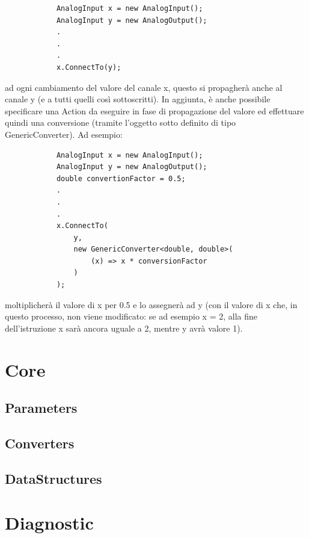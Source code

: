\documentclass{article}
\begin{document}
		\begin{lstlisting}
			AnalogInput x = new AnalogInput();
			AnalogInput y = new AnalogOutput();
			.
			.
			.
			x.ConnectTo(y);
		\end{lstlisting}
	
		ad ogni cambiamento del valore del canale x, questo si propagherà anche al canale y (e a tutti quelli così sottoscritti). In aggiunta, è anche possibile specificare una Action da eseguire in fase di propagazione del valore ed effettuare quindi una conversione (tramite l'oggetto sotto definito di tipo GenericConverter). Ad esempio:
		
		\begin{lstlisting}
			AnalogInput x = new AnalogInput();
			AnalogInput y = new AnalogOutput();
			double convertionFactor = 0.5;
			.
			.
			.
			x.ConnectTo(
				y,
				new GenericConverter<double, double>(
					(x) => x * conversionFactor
				)
			);
		\end{lstlisting}
		
		moltiplicherà il valore di x per 0.5 e lo assegnerà ad y (con il valore di x che, in questo processo, non viene modificato: se ad esempio x = 2, alla fine dell'istruzione x sarà ancora uguale a 2, mentre y avrà valore 1).
	\newpage
	
	\section{Core} \label{section:Core}
	
	\newpage
	
	\subsection{Parameters} \label{subsection:Parameters}
		
	\newpage
	
	\subsection{Converters} \label{subsection:Converters}
	
	\newpage
	
	\subsection{DataStructures} \label{subsection:DataStructures}
	
	\newpage
	
	\section{Diagnostic} \label{section:Diagnostic}
	
\end{document}

